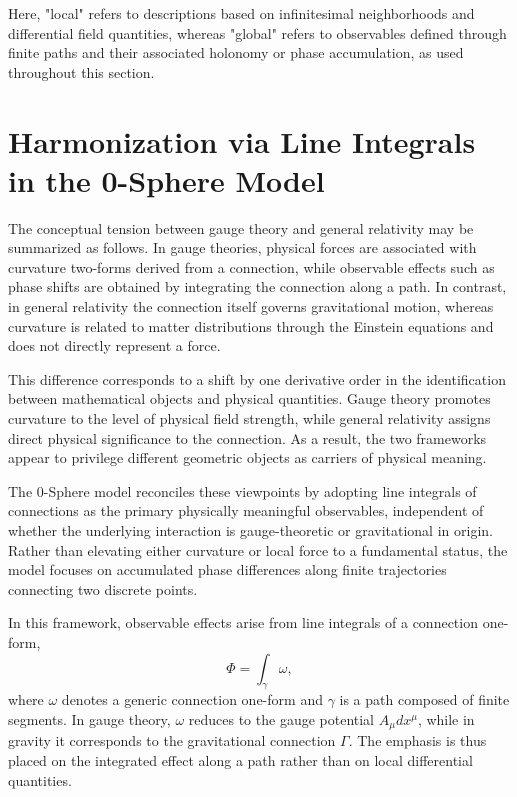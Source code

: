 \documentclass[12pt,letterpaper]{article}
\begin{document}
Here, "local" refers to descriptions based on infinitesimal neighborhoods and differential field quantities, whereas "global" refers to observables defined through finite paths and their associated holonomy or phase accumulation, as used throughout this section.


\section{Harmonization via Line Integrals in the 0-Sphere Model}

\justifying
The conceptual tension between gauge theory and general relativity may be summarized as follows. In gauge theories, physical forces are associated with curvature two-forms derived from a connection, while observable effects such as phase shifts are obtained by integrating the connection along a path. In contrast, in general relativity the connection itself governs gravitational motion, whereas curvature is related to matter distributions through the Einstein equations and does not directly represent a force.

This difference corresponds to a shift by one derivative order in the identification between mathematical objects and physical quantities. Gauge theory promotes curvature to the level of physical field strength, while general relativity assigns direct physical significance to the connection. As a result, the two frameworks appear to privilege different geometric objects as carriers of physical meaning.

The 0-Sphere model reconciles these viewpoints by adopting line integrals of connections as the primary physically meaningful observables, independent of whether the underlying interaction is gauge-theoretic or gravitational in origin. Rather than elevating either curvature or local force to a fundamental status, the model focuses on accumulated phase differences along finite trajectories connecting two discrete points.

In this framework, observable effects arise from line integrals of a connection one-form,
\begin{equation}
\Phi = \int_{\gamma} \omega ,
\end{equation}
where $\omega$ denotes a generic connection one-form and $\gamma$ is a path composed of finite segments.  
In gauge theory, $\omega$ reduces to the gauge potential $A_\mu dx^\mu$, while in gravity it corresponds to the gravitational connection $\Gamma$. The emphasis is thus placed on the integrated effect along a path rather than on local differential quantities.
\end{document}
